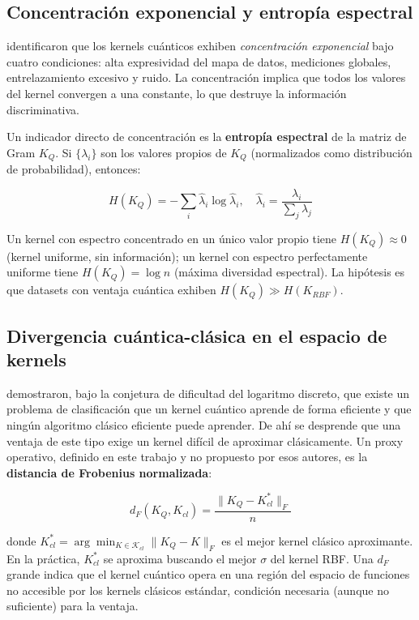\subsection{Concentración exponencial y entropía espectral}

\citet{thanasilp2022} identificaron que los kernels cuánticos exhiben \textit{concentración exponencial} bajo cuatro condiciones: alta expresividad del mapa de datos, mediciones globales, entrelazamiento excesivo y ruido. La concentración implica que todos los valores del kernel convergen a una constante, lo que destruye la información discriminativa.

Un indicador directo de concentración es la \textbf{entropía espectral} de la matriz de Gram $K_Q$. Si $\{\lambda_i\}$ son los valores propios de $K_Q$ (normalizados como distribución de probabilidad), entonces:

\begin{equation}
    H(K_Q) = -\sum_{i} \hat{\lambda}_i \log \hat{\lambda}_i, \quad \hat{\lambda}_i = \frac{\lambda_i}{\sum_j \lambda_j}
    \label{eq:spectral_entropy}
\end{equation}

Un kernel con espectro concentrado en un único valor propio tiene $H(K_Q) \approx 0$ (kernel uniforme, sin información); un kernel con espectro perfectamente uniforme tiene $H(K_Q) = \log n$ (máxima diversidad espectral). La hipótesis es que datasets con ventaja cuántica exhiben $H(K_Q) \gg H(K_{RBF})$.

\subsection{Divergencia cuántica-clásica en el espacio de kernels}

\citet{liu2021} demostraron, bajo la conjetura de dificultad del logaritmo discreto, que existe un problema de clasificación que un kernel cuántico aprende de forma eficiente y que ningún algoritmo clásico eficiente puede aprender. De ahí se desprende que una ventaja de este tipo exige un kernel difícil de aproximar clásicamente. Un proxy operativo, definido en este trabajo y no propuesto por esos autores, es la \textbf{distancia de Frobenius normalizada}:

\begin{equation}
    d_F(K_Q, K_{cl}) = \frac{\|K_Q - K_{cl}^*\|_F}{n}
    \label{eq:frobenius_dist}
\end{equation}

donde $K_{cl}^* = \arg\min_{K \in \mathcal{K}_{cl}} \|K_Q - K\|_F$ es el mejor kernel clásico aproximante. En la práctica, $K_{cl}^*$ se aproxima buscando el mejor $\sigma$ del kernel RBF. Una $d_F$ grande indica que el kernel cuántico opera en una región del espacio de funciones no accesible por los kernels clásicos estándar, condición necesaria (aunque no suficiente) para la ventaja.

